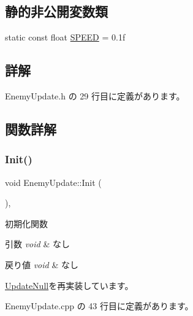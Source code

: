 \subsection*{静的非公開変数類}
\begin{DoxyCompactItemize}
\item 
static const float \mbox{\hyperlink{class_enemy_update_a339b9c72d3144781291bc333dc0c971f}{S\+P\+E\+ED}} = 0.\+1f
\end{DoxyCompactItemize}


\subsection{詳解}


 Enemy\+Update.\+h の 29 行目に定義があります。



\subsection{関数詳解}
\mbox{\label{class_enemy_update_a5b68696e964f71fca73c9143e3770c9d}} 
\subsubsection{\texorpdfstring{Init()}{Init()}}
{\footnotesize\ttfamily void Enemy\+Update\+::\+Init (\begin{DoxyParamCaption}{ }\end{DoxyParamCaption})\hspace{0.3cm}{\ttfamily [override]}, {\ttfamily [virtual]}}



初期化関数 


\begin{DoxyParams}{引数}
{\em void} & なし \\
\hline
\end{DoxyParams}

\begin{DoxyRetVals}{戻り値}
{\em void} & なし \\
\hline
\end{DoxyRetVals}


\mbox{\hyperlink{class_update_null_aaa8f5fe1f03e252ad75eb8c888a5bf46}{Update\+Null}}を再実装しています。



 Enemy\+Update.\+cpp の 43 行目に定義があります。

